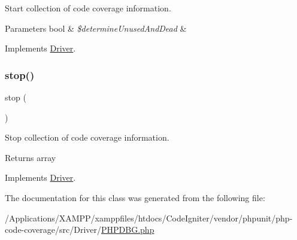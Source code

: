 Start collection of code coverage information.


\begin{DoxyParams}[1]{Parameters}
bool & {\em \$determine\+Unused\+And\+Dead} & \\
\hline
\end{DoxyParams}


Implements \mbox{\hyperlink{interface_sebastian_bergmann_1_1_code_coverage_1_1_driver_1_1_driver_aa3dfff26cb483c3eadbf2418e1729671}{Driver}}.

\mbox{\label{class_sebastian_bergmann_1_1_code_coverage_1_1_driver_1_1_p_h_p_d_b_g_a8b6fc76a620d7557d06e9a11a9ffb509}} 
\subsubsection{\texorpdfstring{stop()}{stop()}}
{\footnotesize\ttfamily stop (\begin{DoxyParamCaption}{ }\end{DoxyParamCaption})}

Stop collection of code coverage information.

\begin{DoxyReturn}{Returns}
array 
\end{DoxyReturn}


Implements \mbox{\hyperlink{interface_sebastian_bergmann_1_1_code_coverage_1_1_driver_1_1_driver_a8b6fc76a620d7557d06e9a11a9ffb509}{Driver}}.



The documentation for this class was generated from the following file\+:\begin{DoxyCompactItemize}
\item 
/\+Applications/\+X\+A\+M\+P\+P/xamppfiles/htdocs/\+Code\+Igniter/vendor/phpunit/php-\/code-\/coverage/src/\+Driver/\mbox{\hyperlink{_p_h_p_d_b_g_8php}{P\+H\+P\+D\+B\+G.\+php}}\end{DoxyCompactItemize}
